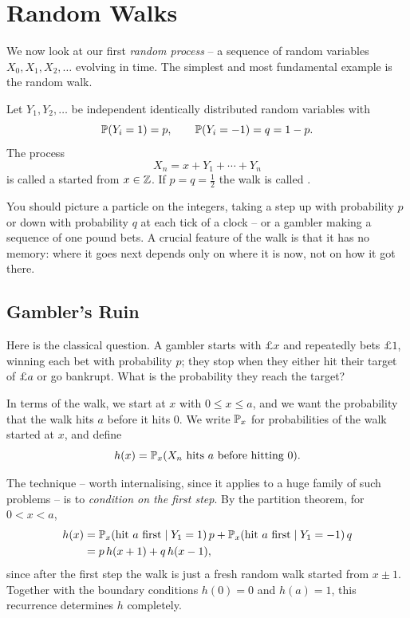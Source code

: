 \documentclass[a4paper]{scrartcl}
\begin{document}
\section{Random Walks}

We now look at our first \emph{random process} -- a sequence of random variables $X_0, X_1, X_2, \dots$ evolving in time. The simplest and most fundamental example is the random walk.

\begin{definition}
	Let $Y_1, Y_2, \dots$ be independent identically distributed random variables with
	$$
	\mathbb{P}(Y_i = 1) = p, \qquad \mathbb{P}(Y_i = -1) = q = 1 - p.
	$$
	The process
	$$
	X_n = x + Y_1 + \cdots + Y_n
	$$
	is called a  started from $x \in \mathbb{Z}$. If $p = q = \frac{1}{2}$ the walk is called .
\end{definition}

You should picture a particle on the integers, taking a step up with probability $p$ or down with probability $q$ at each tick of a clock -- or a gambler making a sequence of one pound bets. A crucial feature of the walk is that it has no memory: where it goes next depends only on where it is now, not on how it got there.

\subsection{Gambler's Ruin}

Here is the classical question. A gambler starts with $\pounds x$ and repeatedly bets $\pounds 1$, winning each bet with probability $p$; they stop when they either hit their target of $\pounds a$ or go bankrupt. What is the probability they reach the target?

In terms of the walk, we start at $x$ with $0 \leq x \leq a$, and we want the probability that the walk hits $a$ before it hits $0$. We write $\mathbb{P}_x$ for probabilities of the walk started at $x$, and define
$$
h(x) = \mathbb{P}_x(X_n \text{ hits } a \text{ before hitting } 0).
$$

The technique -- worth internalising, since it applies to a huge family of such problems -- is to \emph{condition on the first step}. By the partition theorem, for $0 < x < a$,
\begin{align*}
	h(x) &= \mathbb{P}_x(\text{hit } a \text{ first} \mid Y_1 = 1)\,p + \mathbb{P}_x(\text{hit } a \text{ first} \mid Y_1 = -1)\,q \\
	&= p\,h(x + 1) + q\,h(x - 1),
\end{align*}
since after the first step the walk is just a fresh random walk started from $x \pm 1$. Together with the boundary conditions $h(0) = 0$ and $h(a) = 1$, this recurrence determines $h$ completely.
\end{document}
